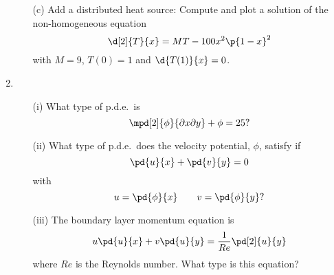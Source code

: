 \documentclass[11pt, oneside]{article}
\begin{document}
\begin{enumerate}
\begin{enumerate}
      \item[(c)]
        Add a distributed heat source: Compute and plot a solution of the
        non-homogeneous equation
        \[
          \d[2]{T}{x} = MT - 100 x^2 \p{1 - x}^2
        \]
        with $M = 9$, $T(0) = 1$ and $\d{T(1)}{x} = 0$.
    \end{enumerate}

  \item %
    \begin{enumerate}
      \item[(i)]
        What type of p.d.e.\ is
        \[
          \mpd[2]{\phi}{\partial x \partial y} + \phi = 25?
        \]

      \item[(ii)]
        What type of p.d.e.\ does the velocity potential, $\phi$, satisfy if
        \[
          \pd{u}{x} + \pd{v}{y} = 0
        \]
        with
        \[
          u = \pd{\phi}{x} \qquad v = \pd{\phi}{y}?
        \]

      \item[(iii)]
        The boundary layer momentum equation is
        \[
          u \pd{u}{x} + v \pd{u}{y} = \frac{1}{Re} \pd[2]{u}{y}
        \]
        where $Re$ is the Reynolds number.
        What type is this equation?
    \end{enumerate}
\end{enumerate}
\end{document}

